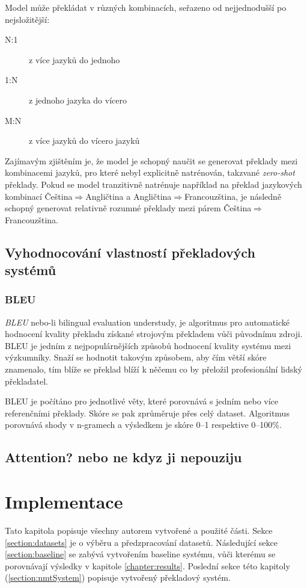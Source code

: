 Model může překládat v různých kombinacích, seřazeno od nejjednodušší po nejsložitější:
\begin{description}
  \item[N:1] z více jazyků do jednoho
  \item[1:N] z jednoho jazyka do vícero
  \item[M:N] z více jazyků do vícero jazyků
\end{description}

Zajímavým zjištěním je, že model je schopný naučit se generovat překlady mezi kombinacemi jazyků, pro které nebyl explicitně natrénován, takzvané \emph{zero-shot} překlady. Pokud se model tranzitivně natrénuje například na překlad jazykových kombinací Čeština$\Rightarrow$Angličtina a Angličtina$\Rightarrow$Francouzština, je následně schopný generovat relativně rozumné překlady mezi párem Čeština$\Rightarrow$Francouzština.


\section{Vyhodnocování vlastností překladových systémů}

\subsection{BLEU} \label{subsection:bleu}
\emph{BLEU} \cite{BLEU} nebo-li bilingual evaluation understudy, je algoritmus pro automatické hodnocení kvality překladu získané strojovým překladem vůči původnímu zdroji. BLEU je jedním z nejpopulárnějších způsobů hodnocení kvality systému mezi výzkumníky. Snaží se hodnotit takovým způsobem, aby čím větší skóre znamenalo, tím blíže se překlad blíží k něčemu co by přeložil profesionální lidský překladatel. 

BLEU je počítáno pro jednotlivé věty, které porovnává s jedním nebo více referenčními překlady. Skóre se pak zprůměruje přes celý dataset. Algoritmus porovnává shody v n-gramech a výsledkem je skóre 0--1 respektive 0--100\%.



\section{Attention? nebo ne kdyz ji nepouziju}

\chapter{Implementace} \label{chapter:implementation}
Tato kapitola popisuje všechny autorem vytvořené a použité části. Sekce \ref{section:datasets} je o výběru a předzpracování datasetů. Následující sekce \ref{section:baseline} se zabývá vytvořením baseline systému, vůči kterému se porovnávají výsledky v kapitole \ref{chapter:results}. Poslední sekce této kapitoly (\ref{section:nmtSystem}) popisuje vytvořený překladový systém.

